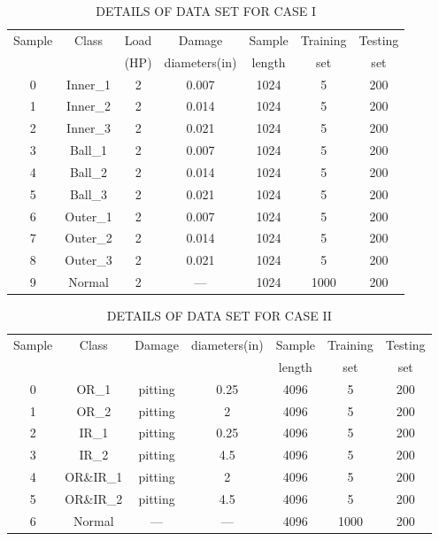 \documentclass[conference,twocolumn]{IEEEtran}
\begin{document}
\begin{table}[htbp]
\centering
\caption{DETAILS OF DATA SET FOR CASE I}
\label{tab:dataset_caseI}
\begin{tabular}{ccccccc}
\toprule
Sample & Class & Load & Damage & Sample & Training & Testing \\
 & & (HP) & diameters(in) & length & set & set \\
\midrule
0 & Inner\_1 & 2 & 0.007 & 1024 & 5 & 200 \\
1 & Inner\_2 & 2 & 0.014 & 1024 & 5 & 200 \\
2 & Inner\_3 & 2 & 0.021 & 1024 & 5 & 200 \\
3 & Ball\_1 & 2 & 0.007 & 1024 & 5 & 200 \\
4 & Ball\_2 & 2 & 0.014 & 1024 & 5 & 200 \\
5 & Ball\_3 & 2 & 0.021 & 1024 & 5 & 200 \\
6 & Outer\_1 & 2 & 0.007 & 1024 & 5 & 200 \\
7 & Outer\_2 & 2 & 0.014 & 1024 & 5 & 200 \\
8 & Outer\_3 & 2 & 0.021 & 1024 & 5 & 200 \\
9 & Normal & 2 & --- & 1024 & 1000 & 200 \\
\bottomrule
\end{tabular}
\end{table}

\begin{table}[htbp]
\centering
\caption{DETAILS OF DATA SET FOR CASE II}
\label{tab:dataset_caseII}
\begin{tabular}{ccccccc}
\toprule
Sample & Class & Damage & diameters(in) & Sample & Training & Testing \\
 & & & & length & set & set \\
\midrule
0 & OR\_1 & pitting & 0.25 & 4096 & 5 & 200 \\
1 & OR\_2 & pitting & 2 & 4096 & 5 & 200 \\
2 & IR\_1 & pitting & 0.25 & 4096 & 5 & 200 \\
3 & IR\_2 & pitting & 4.5 & 4096 & 5 & 200 \\
4 & OR\&IR\_1 & pitting & 2 & 4096 & 5 & 200 \\
5 & OR\&IR\_2 & pitting & 4.5 & 4096 & 5 & 200 \\
6 & Normal & --- & --- & 4096 & 1000 & 200 \\
\bottomrule
\end{tabular}
\end{table}
\end{document}
